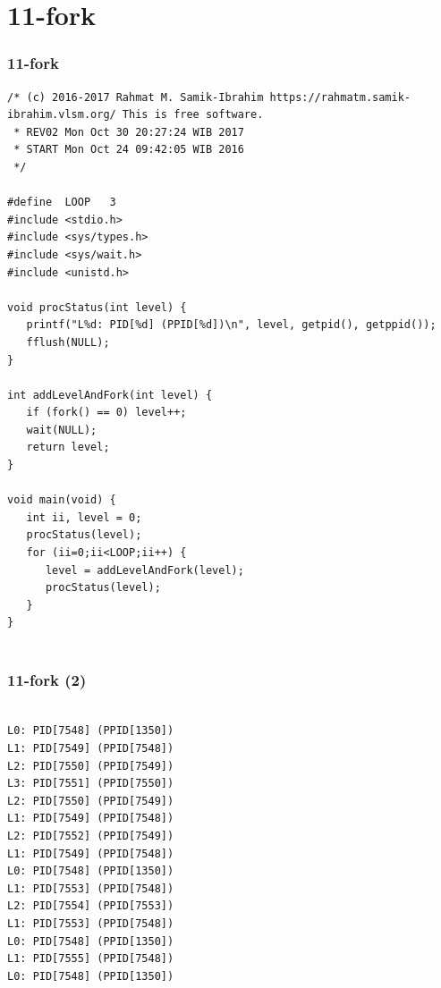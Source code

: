 \documentclass[aspectratio=169, xcolor=table, notheorems, hyperref={pdfpagelabels=false}]{beamer}
\begin{document}
\section{11-fork}
\begin{frame}[fragile]
\frametitle{11-fork}
\begin{lstlisting}[basicstyle=\ttfamily\tiny]
/* (c) 2016-2017 Rahmat M. Samik-Ibrahim https://rahmatm.samik-ibrahim.vlsm.org/ This is free software.
 * REV02 Mon Oct 30 20:27:24 WIB 2017
 * START Mon Oct 24 09:42:05 WIB 2016
 */

#define  LOOP   3
#include <stdio.h>
#include <sys/types.h>
#include <sys/wait.h>
#include <unistd.h>

void procStatus(int level) {
   printf("L%d: PID[%d] (PPID[%d])\n", level, getpid(), getppid());
   fflush(NULL);
}

int addLevelAndFork(int level) {
   if (fork() == 0) level++;
   wait(NULL);
   return level;
}

void main(void) {
   int ii, level = 0;
   procStatus(level);
   for (ii=0;ii<LOOP;ii++) {
      level = addLevelAndFork(level);
      procStatus(level);
   }
}
 
\end{lstlisting}
\end{frame}

\begin{frame}[fragile]
\frametitle{11-fork (2)}
\begin{lstlisting}[basicstyle=\ttfamily\footnotesize]

L0: PID[7548] (PPID[1350])
L1: PID[7549] (PPID[7548])
L2: PID[7550] (PPID[7549])
L3: PID[7551] (PPID[7550])
L2: PID[7550] (PPID[7549])
L1: PID[7549] (PPID[7548])
L2: PID[7552] (PPID[7549])
L1: PID[7549] (PPID[7548])
L0: PID[7548] (PPID[1350])
L1: PID[7553] (PPID[7548])
L2: PID[7554] (PPID[7553])
L1: PID[7553] (PPID[7548])
L0: PID[7548] (PPID[1350])
L1: PID[7555] (PPID[7548])
L0: PID[7548] (PPID[1350])

\end{lstlisting}
\end{frame}
\end{document}
